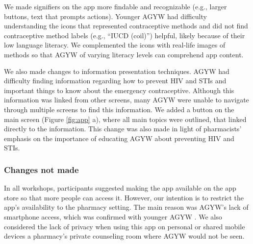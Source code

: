 We made signifiers on the app more findable and recognizable (e.g., larger buttons, text that prompts actions). Younger AGYW had difficulty understanding the icons that represented contraceptive methods and did not find contraceptive method labels (e.g., “IUCD (coil)”) helpful, likely because of their low language literacy. We complemented the icons with real-life images of methods so that AGYW of varying literacy levels can comprehend app content.

We also made changes to information presentation techniques. AGYW had difficulty finding information regarding how to prevent HIV and STIs and important things to know about the emergency contraceptive. Although this information was linked from other screens, many AGYW were unable to navigate through multiple screens to find this information. We added a button on the main screen (Figure \ref{fig:app} a), where all main topics were outlined, that linked directly to the information. This change was also made in light of pharmacists’ emphasis on the importance of educating AGYW about preventing HIV and STIs.

\subsubsection{Changes not made}
\label{changes-not-made}

In all workshops, participants suggested making the  app available on the app store so that more people can access it. However, our intention is to restrict the app’s availability to the pharmacy setting. The main reason was AGYW’s lack of smartphone access, \lrem
{which was confirmed with} younger AGYW  . We also considered the lack of privacy when using this app on personal or shared mobile devices a pharmacy’s private counseling room where AGYW would not be seen. 

